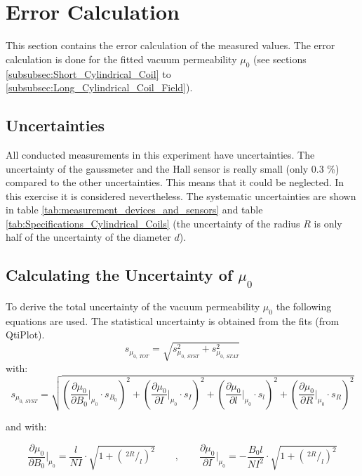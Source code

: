 \section{Error Calculation}
\label{sec:Error_Calculation}
This section contains the error calculation of the measured values. The error calculation is done for the fitted vacuum permeability $\mu_0$ (see sections \ref{subsubsec:Short_Cylindrical_Coil} to \ref{subsubsec:Long_Cylindrical_Coil_Field}).

\subsection{Uncertainties}
\label{subsec:Uncertainties}
All conducted measurements in this experiment have uncertainties. The uncertainty of the gaussmeter and the Hall sensor is really small (only 0.3 \%) compared to the other uncertainties. This means that it could be neglected. In this exercise it is considered nevertheless. The systematic uncertainties are shown in table \ref{tab:measurement_devices_and_sensors} and table \ref{tab:Specifications_Cylindrical_Coils} (the uncertainty of the radius $R$ is only half of the uncertainty of the diameter $d$).

\subsection{Calculating the Uncertainty of $\mu_0$}
\label{subsec:Calculating_the_Uncertainty}
To derive the total uncertainty of the vacuum permeability $\mu_0$ the following equations are used. The statistical uncertainty is obtained from the fits (from QtiPlot).
\begin{equation}
s_{\mu_{0,\ TOT}}=\sqrt{s_{\mu_{0,\ SYST}}^2+s_{\mu_{0,\ STAT}}^2}
\label{eq:total_uncert}
\end{equation}
with:
\begin{equation}
s_{\mu_{0,\ SYST}}=\sqrt{\left(\frac{\partial \mu_0}{\partial B_0}\Biggr|_{\mu_0}\cdot s_{B_0}\right)^2 + \left(\frac{\partial \mu_0}{\partial I}\Biggr|_{\mu_0}\cdot s_{I}\right)^2 + \left(\frac{\partial \mu_0}{\partial l}\Biggr|_{\mu_0}\cdot s_{l}\right)^2 + \left(\frac{\partial \mu_0}{\partial R}\Biggr|_{\mu_0}\cdot s_{R}\right)^2}
\label{eq:error_propagation}
\end{equation}

and with:

\[
\frac{\partial \mu_0}{\partial B_0}\Biggr|_{\mu_0}=\frac{l}{NI}\cdot\sqrt{1+(\,^{2R}\!/_{l})^2} \qquad , \qquad \frac{\partial \mu_0}{\partial I}\Biggr|_{\mu_0}=-\frac{B_0l}{NI^2}\cdot\sqrt{1+(\,^{2R}\!/_{l})^2}
\]

